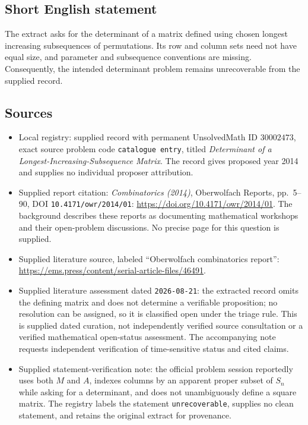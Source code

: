 \documentclass[11pt]{article}
\begin{document}
\subsection{Short English statement}
The extract asks for the determinant of a matrix defined using chosen longest increasing subsequences of permutations. Its row and column sets need not have equal size, and parameter and subsequence conventions are missing. Consequently, the intended determinant problem remains unrecoverable from the supplied record.
\subsection{Sources}
\begin{itemize}
\item Local registry: supplied record with permanent UnsolvedMath ID \(30002473\), exact source problem code \texttt{catalogue entry}, titled \emph{Determinant of a Longest-Increasing-Subsequence Matrix}. The record gives proposed year 2014 and supplies no individual proposer attribution.
\item Supplied report citation: \emph{Combinatorics (2014)}, Oberwolfach Reports, pp.~5--90, DOI \texttt{10.4171/owr/2014/01}: \url{https://doi.org/10.4171/owr/2014/01}. The background describes these reports as documenting mathematical workshops and their open-problem discussions. No precise page for this question is supplied.
\item Supplied literature source, labeled ``Oberwolfach combinatorics report'': \url{https://ems.press/content/serial-article-files/46491}.
\item Supplied literature assessment dated \texttt{2026-08-21}: the extracted record omits the defining matrix and does not determine a verifiable proposition; no resolution can be assigned, so it is classified open under the triage rule. This is supplied dated curation, not independently verified source consultation or a verified mathematical open-status assessment. The accompanying note requests independent verification of time-sensitive status and cited claims.
\item Supplied statement-verification note: the official problem session reportedly uses both \(M\) and \(A\), indexes columns by an apparent proper subset of \(S_n\) while asking for a determinant, and does not unambiguously define a square matrix. The registry labels the statement \texttt{unrecoverable}, supplies no clean statement, and retains the original extract for provenance.
\end{itemize}
\end{document}
